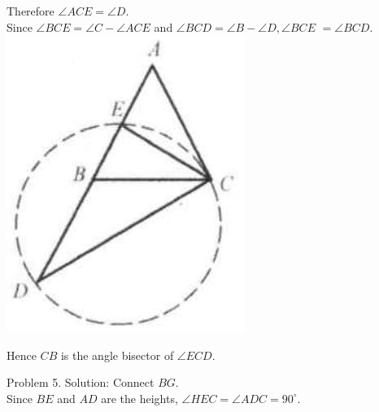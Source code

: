 \documentclass[10pt]{article}
\begin{document}
Therefore \(\angle A C E=\angle D\).\\
Since \(\angle B C E=\angle C-\angle A C E\) and \(\angle B C D=\angle B-\angle D, \angle B C E\) \(=\angle B C D\).\\
\includegraphics[max width=\textwidth, center]{2025_04_17_97bc1f7e44d93c271a88g-209(1)}

Hence \(C B\) is the angle bisector of \(\angle E C D\).

Problem 5. Solution:
Connect \(B G\).\\
Since \(B E\) and \(A D\) are the heights, \(\angle H E C=\angle A D C=90^{\circ}\).
\end{document}
